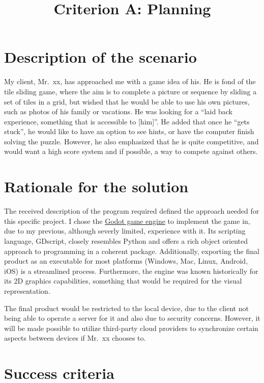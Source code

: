 \documentclass[12pt]{article}
\begin{document}
\title{Criterion A: Planning\vspace{-3em}}
\date{}
\author{}

\maketitle

\section{Description of the scenario}

My client, Mr.\ xx, has approached me with a game idea of his. He is fond of
the tile sliding game, where the aim is to complete a picture or sequence by sliding a set
of tiles in a grid, but wished that he would be able to use his own pictures,
such as photos of his family or vacations. He was looking for a ``laid back
experience, something that is accessible to [him]''. He added that once he ``gets
stuck'', he would like to have an option to see hints, or have the computer
finish solving the puzzle. However, he also emphasized that he is quite
competitive, and would want a high score system and if possible, a way to
compete against others.

\section{Rationale for the solution}

The received description of the program required defined the approach needed for
this specific project. I chose the \href{https://godotengine.org/}{Godot game
engine} to implement the game in, due to my previous, although severly limited,
experience with it. Its scripting language, GDscript, closely resembles Python
and offers a rich object oriented approach to programming in a coherent package.
Additionally, exporting the final product as an executable for most platforms
(Windows, Mac, Linux, Android, iOS) is a streamlined process. Furthermore, the
engine was known historically for its 2D graphics capabilities, something that
would be required for the visual representation.

The final product would be restricted to the local device, due to the client
not being able to operate a server for it and also due to security concerns.
However, it will be made possible to utilize third-party cloud providers to
synchronize certain aspects between devices if Mr.\ xx chooses to.

\section{Success criteria}
\end{document}
